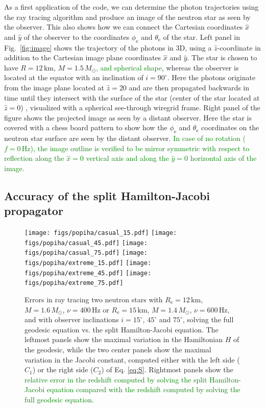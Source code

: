 \documentclass{aa}
\newcommand{\refe}[1]{\textcolor{green}{{#1}}}
\newcommand{\Msun}{\ensuremath{M_{\odot}}}
\begin{document}
As a first application of the code, we can determine the photon trajectories using the ray tracing algorithm and produce an image of the neutron star as seen by the observer.
This also shows how we can connect the Cartesian coordinates $\hat{x}$ and $\hat{y}$ of the observer to the coordinates $\phi_{\mathrm{e}}$ and $\theta_{\mathrm{e}}$ of the star.
Left panel in Fig.~\ref{fig:image} shows the trajectory of the photons in 3D, using a $\hat{z}$-coordinate in addition to the Cartesian image plane coordinates $\hat{x}$ and $\hat{y}$.
The star is chosen to have $R=12\,\mathrm{km}$, $M=1.5\,\Msun$\refe{, and spherical shape}, whereas the observer is located at the equator with an inclination of $i = 90^{\circ}$.
Here the photons originate from the image plane located at $\hat{z} = 20$ and are then propagated backwards in time until they intersect with the surface of the star (center of the star located at $\hat{z} = 0$) , visualized with a spherical see-through wiregrid frame.
Right panel of the figure shows the projected image as seen by a distant observer.
Here the star is covered with a chess board pattern to show how the $\phi_{\mathrm{e}}$ and $\theta_{\mathrm{e}}$ coordinates on the neutron star surface are seen by the distant observer.
\refe{In case of no rotation ($f = 0\,\mathrm{Hz}$), the image outline is verified to be mirror symmetric with respect to reflection along the $\hat{x} = 0$ vertical axis and along the $\hat{y} = 0$ horizontal axis of the image.}


\subsection{Accuracy of the split Hamilton-Jacobi propagator}

\begin{figure}[htbp!]
\centering
\texttt{[image: figs/popiha/casual\_15.pdf]}
\texttt{[image: figs/popiha/casual\_45.pdf]}
\texttt{[image: figs/popiha/casual\_75.pdf]}
\texttt{[image: figs/popiha/extreme\_15.pdf]}
\texttt{[image: figs/popiha/extreme\_45.pdf]}
\texttt{[image: figs/popiha/extreme\_75.pdf]}
\caption{\label{fig:H_C1_C2}
    Errors in ray tracing two neutron stars with $R_{\mathrm{e}}=12\,\mathrm{km}$, $M=1.6\,\Msun$, $\nu=400\,\mathrm{Hz}$ or $R_{\mathrm{e}}=15\,\mathrm{km}$, $M=1.4\,\Msun$, $\nu=600\,\mathrm{Hz}$, and with observer inclinations $i=15^\circ$, $45^\circ$ and $75^\circ$, solving the full geodesic equation vs. the split Hamilton-Jacobi equation.
    The leftmost panels show the maximal variation in the Hamiltonian $H$ of the geodesic, while the two center panels show the maximal variation in the Jacobi constant, computed either with the left side ($C_1$) or the right side ($C_2$) of Eq. \eqref{eq:S}.
    Rightmost panels show the \refe{relative error in the redshift computed by solving the split Hamilton-Jacobi equation compared with the redshift computed by solving the full geodesic equation.}
}
\end{figure}
\end{document}
